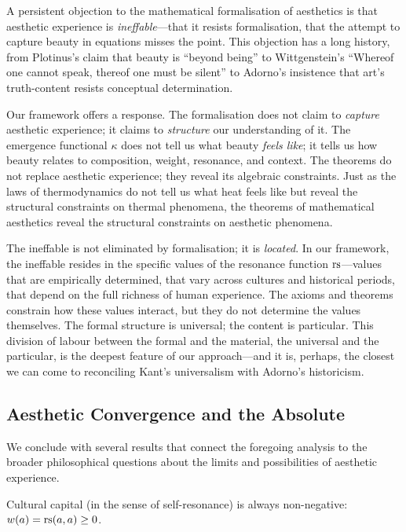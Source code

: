 \begin{remark}
\label{rem:formal-ineffable}
A persistent objection to the mathematical formalisation of aesthetics is that aesthetic experience is \emph{ineffable}---that it resists formalisation, that the attempt to capture beauty in equations misses the point.  This objection has a long history, from Plotinus's claim that beauty is ``beyond being'' to Wittgenstein's ``Whereof one cannot speak, thereof one must be silent'' to Adorno's insistence that art's truth-content resists conceptual determination.

Our framework offers a response.  The formalisation does not claim to \emph{capture} aesthetic experience; it claims to \emph{structure} our understanding of it.  The emergence functional $\kappa$ does not tell us what beauty \emph{feels like}; it tells us how beauty relates to composition, weight, resonance, and context.  The theorems do not replace aesthetic experience; they reveal its algebraic constraints.  Just as the laws of thermodynamics do not tell us what heat feels like but reveal the structural constraints on thermal phenomena, the theorems of mathematical aesthetics reveal the structural constraints on aesthetic phenomena.

The ineffable is not eliminated by formalisation; it is \emph{located}.  In our framework, the ineffable resides in the specific values of the resonance function $\mathrm{rs}$---values that are empirically determined, that vary across cultures and historical periods, that depend on the full richness of human experience.  The axioms and theorems constrain how these values interact, but they do not determine the values themselves.  The formal structure is universal; the content is particular.  This division of labour between the formal and the material, the universal and the particular, is the deepest feature of our approach---and it is, perhaps, the closest we can come to reconciling Kant's universalism with Adorno's historicism.
\end{remark}

\subsection{Aesthetic Convergence and the Absolute}

We conclude with several results that connect the foregoing analysis to the
broader philosophical questions about the limits and possibilities of
aesthetic experience.

\begin{theorem}
\label{thm:cultural-capital-nonneg}
Cultural capital (in the sense of self-resonance) is always non-negative: $w(a) = \mathrm{rs}(a, a) \geq 0$.
\end{theorem}

